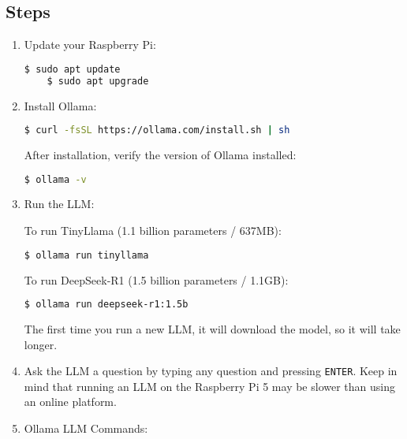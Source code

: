 \documentclass[a4paper,12pt]{article}
\begin{document}
\subsection{Steps}
\begin{enumerate}
    \item Update your Raspberry Pi:
    \begin{lstlisting}[language=bash, breaklines=true, breakatwhitespace=true, columns=fullflexible]
    $ sudo apt update
    $ sudo apt upgrade
    \end{lstlisting}

    \item Install Ollama:
    \begin{lstlisting}[language=bash, breaklines=true, breakatwhitespace=true, columns=fullflexible]
    $ curl -fsSL https://ollama.com/install.sh | sh
    \end{lstlisting}
    After installation, verify the version of Ollama installed:
    \begin{lstlisting}[language=bash, breaklines=true, breakatwhitespace=true, columns=fullflexible]
    $ ollama -v
    \end{lstlisting}

    \item Run the LLM:

    To run TinyLlama (1.1 billion parameters / 637MB):
    \begin{lstlisting}[language=bash, breaklines=true, breakatwhitespace=true, columns=fullflexible]
    $ ollama run tinyllama
    \end{lstlisting}

    To run DeepSeek-R1 (1.5 billion parameters / 1.1GB):
    \begin{lstlisting}[language=bash, breaklines=true, breakatwhitespace=true, columns=fullflexible]
    $ ollama run deepseek-r1:1.5b
    \end{lstlisting}

    The first time you run a new LLM, it will download the model, so it will take longer. 	

    \item Ask the LLM a question by typing any question and pressing \texttt{ENTER}. Keep in mind that running an LLM on the Raspberry Pi 5 may be slower than using an online platform.
    
    \item Ollama LLM Commands:


\end{enumerate}
\end{document}
